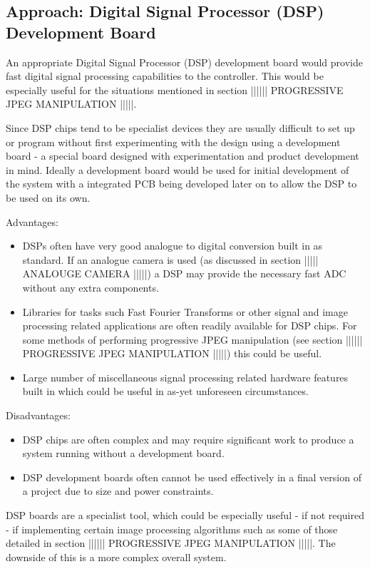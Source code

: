 \subsection{Approach: Digital Signal Processor (DSP) Development Board}
An appropriate Digital Signal Processor (DSP) development board would provide fast digital signal processing capabilities to the controller. This would be especially useful for the situations mentioned in section |||||| PROGRESSIVE JPEG MANIPULATION |||||.

Since DSP chips tend to be specialist devices they are usually difficult to set up or program without first experimenting with the design using a development board - a special board designed with experimentation and product development in mind. Ideally a development board would be used for initial development of the system with a integrated PCB being developed later on to allow the DSP to be used on its own.

Advantages:
\begin{itemize}
\item DSPs often have very good analogue to digital conversion built in as standard. If an analogue camera is used (as discussed in section ||||| ANALOUGE CAMERA |||||) a DSP may provide the necessary fast ADC without any extra components.

\item Libraries for tasks such Fast Fourier Transforms or other signal and image processing related applications are often readily available for DSP chips. For some methods of performing progressive JPEG manipulation (see section |||||| PROGRESSIVE JPEG MANIPULATION |||||) this could be useful.

\item Large number of miscellaneous signal processing related hardware features built in which could be useful in as-yet unforeseen circumstances.
\end{itemize}

Disadvantages:
\begin{itemize}
\item DSP chips are often complex and may require significant work to produce a system running without a development board.

\item DSP development boards often cannot be used effectively in a final version of a project due to size and power constraints.
\end{itemize}


DSP boards are a specialist tool, which could be especially useful - if not required - if implementing certain image processing algorithms such as some of those detailed in section |||||| PROGRESSIVE JPEG MANIPULATION |||||. The downside of this is a more complex overall system.

